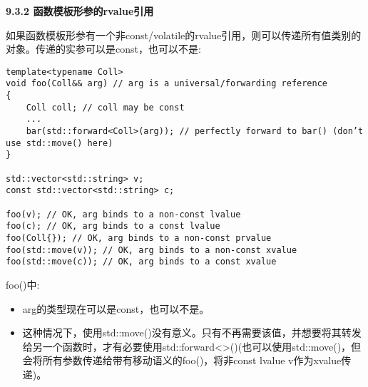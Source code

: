 \hspace*{\fill} \par %
\textbf{9.3.2 函数模板形参的rvalue引用}

如果函数模板形参有一个非const/volatile的rvalue引用，则可以传递所有值类别的对象。传递的实参可以是const，也可以不是:\par

\begin{lstlisting}[caption={}]
template<typename Coll>
void foo(Coll&& arg) // arg is a universal/forwarding reference
{
	Coll coll; // coll may be const
	...
	bar(std::forward<Coll>(arg)); // perfectly forward to bar() (don’t use std::move() here)
}

std::vector<std::string> v;
const std::vector<std::string> c;

foo(v); // OK, arg binds to a non-const lvalue
foo(c); // OK, arg binds to a const lvalue
foo(Coll{}); // OK, arg binds to a non-const prvalue
foo(std::move(v)); // OK, arg binds to a non-const xvalue
foo(std::move(c)); // OK, arg binds to a const xvalue
\end{lstlisting}

foo()中:\par

\begin{itemize}
	\item arg的类型现在可以是const，也可以不是。
	\item 这种情况下，使用std::move()没有意义。只有不再需要该值，并想要将其转发给另一个函数时，才有必要使用std::forward<>()(也可以使用std::move()，但会将所有参数传递给带有移动语义的foo()，将非const lvalue v作为xvalue传递)。
\end{itemize}












